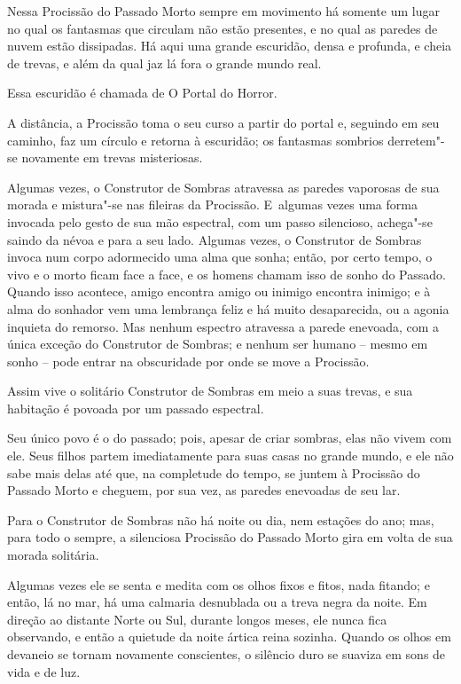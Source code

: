 Nessa Procissão do Passado Morto sempre em movimento há somente um lugar
no qual os fantasmas que circulam não estão presentes, e no qual as
paredes de nuvem estão dissipadas. Há aqui uma grande escuridão, densa e
profunda, e cheia de trevas, e além da qual jaz lá fora o grande mundo
real.

Essa escuridão é chamada de O Portal do Horror.

A distância, a Procissão toma o seu curso a partir do portal e, seguindo em
seu caminho, faz um círculo e retorna à escuridão; os fantasmas sombrios
derretem"-se novamente em trevas misteriosas.

Algumas vezes, o Construtor de Sombras atravessa as paredes vaporosas de
sua morada e mistura"-se nas fileiras da Procissão. E~algumas vezes uma
forma invocada pelo gesto de sua mão espectral, com um passo silencioso,
achega"-se saindo da névoa e para a seu lado. Algumas vezes, o
Construtor de Sombras invoca num corpo adormecido uma alma que sonha;
então, por certo tempo, o vivo e o morto ficam face a face, e os homens
chamam isso de sonho do Passado. Quando isso acontece, amigo encontra
amigo ou inimigo encontra inimigo; e à alma do sonhador vem uma
lembrança feliz e há muito desaparecida, ou a agonia inquieta do
remorso. Mas nenhum espectro atravessa a parede enevoada, com a única
exceção do Construtor de Sombras; e nenhum ser humano -- mesmo em sonho
-- pode entrar na obscuridade por onde se move a Procissão.

Assim vive o solitário Construtor de Sombras em meio a suas trevas, e sua
habitação é povoada por um passado espectral.

Seu único povo é o do passado; pois, apesar de criar sombras, elas
não vivem com ele. Seus filhos partem imediatamente para suas casas no
grande mundo, e ele não sabe mais delas até que, na completude do tempo,
se juntem à Procissão do Passado Morto e cheguem, por sua vez,
as paredes enevoadas de seu lar.



Para o Construtor de Sombras não há noite ou dia, nem estações do ano;
mas, para todo o sempre, a silenciosa Procissão do Passado Morto gira
em volta de sua morada solitária.

Algumas vezes ele se senta e medita com os olhos fixos e fitos, nada
fitando; e então, lá no mar, há uma calmaria desnublada ou a treva negra
da noite. Em direção ao distante Norte ou Sul, durante longos meses, ele
nunca fica observando, e então a quietude da noite ártica reina sozinha. Quando os
olhos em devaneio se tornam novamente conscientes, o silêncio duro se
suaviza em sons de vida e de luz.

